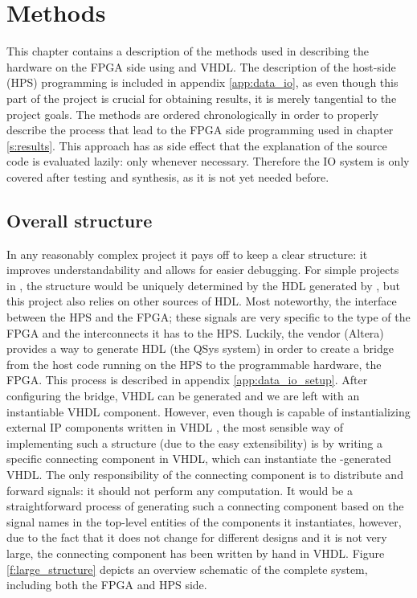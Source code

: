 \chapter{Methods}
This chapter contains a description of the methods used in describing the hardware on the FPGA side using \clash{} and VHDL. The description of the host-side (HPS) programming is included in appendix \ref{app:data_io}, as even though this part of the project is crucial for obtaining results, it is merely tangential to the project goals. The methods are ordered chronologically in order to properly describe the process that lead to the FPGA side programming used in chapter \ref{s:results}. This approach has as side effect that the explanation of the source code is evaluated lazily: only whenever necessary. Therefore the IO system is only covered after testing and synthesis, as it is not yet needed before.

\section{Overall structure}
In any reasonably complex project it pays off to keep a clear structure: it improves understandability and allows for easier debugging. For simple projects in \clash{}, the structure would be uniquely determined by the HDL generated by \clash{}, but this project also relies on other sources of HDL. Most noteworthy, the interface between the HPS and the FPGA; these signals are very specific to the type of the FPGA and the interconnects it has to the HPS. Luckily, the vendor (Altera) provides a way to generate HDL (the QSys system) in order to create a bridge from the host code running on the HPS to the programmable hardware, the FPGA. This process is described in appendix \ref{app:data_io_setup}. After configuring the bridge, VHDL can be generated and we are left with an instantiable VHDL component. However, even though \clash{} is capable of instantializing external IP components written in VHDL \cite{CLaSHBlogTut}, the most sensible way of implementing such a structure (due to the easy extensibility) is by writing a specific connecting component in VHDL, which can instantiate the \clash{}-generated VHDL. The only responsibility of the connecting component is to distribute and forward signals: it should not perform any computation. It would be a straightforward process of generating such a connecting component based on the signal names in the top-level entities of the components it instantiates, however, due to the fact that it does not change for different designs and it is not very large, the connecting component has been written by hand in VHDL. Figure \ref{f:large_structure} depicts an overview schematic of the complete system, including both the FPGA and HPS side.

